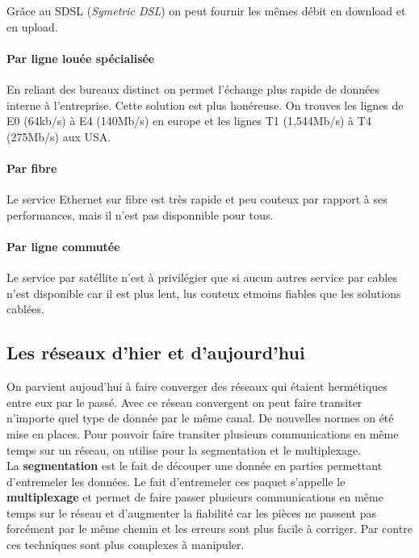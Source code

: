  \smallskip

 Grâce au SDSL (\textit{Symetric DSL}) on peut fournir les mêmes débit en download et en upload.


 \paragraph{Par ligne louée spécialisée}\leavevmode

 \smallskip

 En reliant des bureaux distinct on permet l'échange plus rapide de données interne à l'entreprise. Cette solution est plus honéreuse. On trouves les lignes de E0 (64kb/s) à E4 (140Mb/s) en europe et les lignes T1 (1,544Mb/s) à T4 (275Mb/s) aux USA\@.


 \paragraph{Par fibre}\leavevmode

 \smallskip

 Le service Ethernet sur fibre est très rapide et peu couteux par rapport à ses performances, mais il n'est pas disponnible pour tous.



 \paragraph{Par ligne commutée}\leavevmode

 \smallskip

 Le service par satéllite n'est à privilégier que si aucun autres service par cables n'est disponible car il est plus lent, lus couteux etmoins fiables que les solutions cablées.

 \subsection{Les réseaux d'hier et d'aujourd'hui}

 On parvient aujoud'hui à faire converger des réseaux qui étaient hermétiques entre eux par le passé. Avec ce réseau convergent on peut faire transiter n'importe quel type de donnée par le même canal. De nouvelles normes on été mise en places. Pour pouvoir faire transiter plusieurs communications en même temps sur un réseau, on utilise pour la segmentation et le multiplexage.\\

 \indent
 La \textbf{segmentation} est le fait de découper une donnée en parties permettant d'entremeler les données. Le fait d'entremeler ces paquet s'appelle le \textbf{multiplexage} et permet de faire passer plusieurs communications en même temps sur le réseau et d'augmenter la fiabilité car les pièces ne passent pas forcément par le même chemin et les erreurs sont plus facile à corriger. Par contre ces techniques sont plus complexes à manipuler.\\

